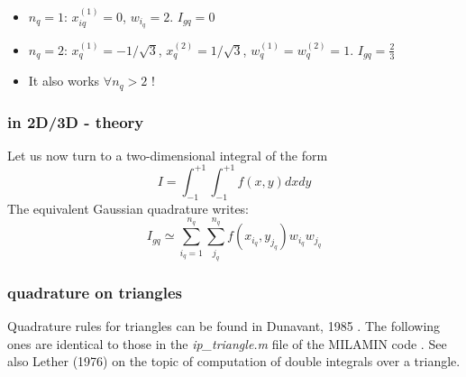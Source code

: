 \begin{itemize}
\item $n_q=1$: $x_{iq}^{(1)}=0$, $w_{i_q}=2$. $I_{gq}=0$
\item $n_q=2$: $x_{q}^{(1)}=-1/\sqrt{3}$, $x_{q}^{(2)}=1/\sqrt{3}$, $w_{q}^{(1)}=w_{q}^{(2)}=1$. $I_{gq}=\frac{2}{3}$
\item It also works $\forall n_q>2$ !
\end{itemize}

\subsubsection{in 2D/3D - theory}


Let us now turn to a two-dimensional integral of the form
\[
I=\int_{-1}^{+1} \int_{-1}^{+1} f(x,y) dx dy
\]
The equivalent Gaussian quadrature writes:
\[
I_{gq}
\simeq \sum_{i_q=1}^{n_q}\sum_{j_q}^{n_q} f(x_{i_q},y_{j_q}) w_{i_q} w_{j_q}
\]

\subsubsection{quadrature on triangles}

Quadrature rules for triangles can be found in Dunavant, 1985 \cite{duna85}.
The following ones are identical to those in the {\sl ip\_triangle.m} 
file of the MILAMIN code \cite{daks08}. See also Lether (1976) \cite{leth76}
on the topic of computation of double integrals over a triangle.


